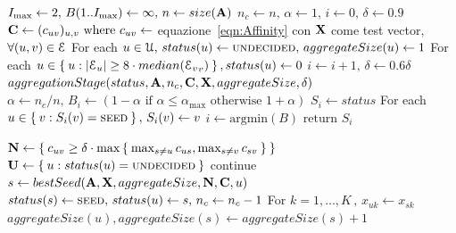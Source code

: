 \begin{algorithm}
\caption{$S = aggregate(\A,\matr{X},\alpha_{\max},I_{\max})$}\label{alg:Aggregate}
\begin{algorithmic}[1]
\State $I_{\max} \gets 2,\, B(1..I_{\max}) \gets \infty,\, n \gets size(\mathbf{A})$
\State $n_c \gets n,\, \alpha \gets 1,\, i \gets 0,\, \delta \gets 0.9 $
\State $\mathbf{C} \gets (c_{uv})_{u,v} \text{ where } c_{uv} \gets$ equazione~\eqref{eqn:Affinity} con $\mathbf{X}$ come test vector, $\forall (u,v) \in \mathcal{E}$
\State For each $u \in \mathcal{U},\, status(u) \gets \textsc{undecided},\, aggregateSize(u) \gets 1$\label{alg:Aggregate:1}
\State For each $u \in \Set{u : \lvert\mathcal{E}_u\rvert \ge 8\cdot median({\mathcal{E}_v}_v)}, status(u) \gets 0$\label{alg:Aggregate:2}
	\State $ i \gets i+1,\, \delta \gets 0.6\delta$
	\State $aggregationStage(status,\A,n_c,\matr{C},\matr{X},aggregateSize,\delta)$
	\State $\alpha \gets n_c/n,\, B_i \gets (1- \alpha \text{ if } \alpha \le \alpha_{\max} \text{ otherwise } 1+ \alpha)$\label{alg:Aggregate:3}
	\State $S_i \gets status$
	\State For each $u \in \Set{v:S_i(v) = \textsc{seed}},\,S_i(v) \gets v$
\EndWhile
\State $i \gets \text{argmin}(B)$
\State $\text{return } S_i$
\end{algorithmic}
\end{algorithm}


\begin{algorithm}
\caption{$aggregationStage(status,\A,n_c,\matr{C},\matr{X},aggregateSize,\delta)$}\label{alg:aggregationStage}
\begin{algorithmic}[1]
\State $\mathbf{N} \gets \Set{c_{uv} \ge \delta\cdot\max\Set{\max_{s\ne u} c_{us}, \max_{s\ne v} c_{sv}}} $
\State $\mathbf{U} \gets \Set{u:status(u) = \text{\textsc{undecided}}}$
		\State continue
	\EndIf
	\State $s \gets bestSeed(\mathbf{A},\mathbf{X},aggregateSize,\mathbf{N},\mathbf{C},u)$
		\State $status(s)\gets \text{\textsc{seed}},\, status(u) \gets s,\, n_c \gets n_c - 1$
		\State For $k = 1,\dots,K \,,\, x_{uk} \gets x_{sk}$
		\State $aggregateSize(u),aggregateSize(s) \gets aggregateSize(s) + 1$
	\EndIf
\EndFor
\end{algorithmic}
\end{algorithm}

